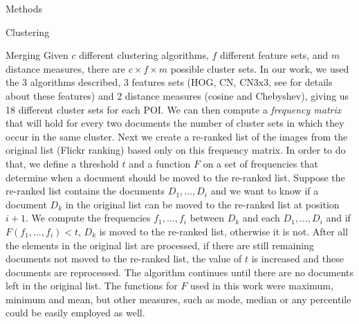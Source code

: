 \documentclass{acm_proc_article-me}
\begin{document}
\begin{section}{Methods}
\begin{subsection}{Clustering}
\begin{subsubsection}{Merging}
Given $c$ different clustering algorithms, $f$ different feature sets, and $m$ distance measures, there are $c \times f \times m$ possible cluster sets. 
In our work, we used the 3 algorithms described, 3 features sets (HOG, CN, CN3x3, see \cite{overview14} for details about these features) and 2 distance measures (cosine and Chebyshev), giving us 18 different cluster sets for each POI.
We can then compute a \emph{frequency matrix} that will hold for every two documents the number of cluster sets in which they occur in the same cluster.
Next we create a re-ranked list of the images from the original list (Flickr ranking) based only on this frequency matrix.
In order to do that, we define a threshold $t$ and a function $F$ on a set of frequencies that determine when a document should be moved to the re-ranked list.
Suppose the re-ranked list contains the documents $D_1, ..., D_i$ and we want to know if a document $D_k$ in the original list can be moved to the re-ranked list at position $i+1$. We compute the frequencies $f_1, ..., f_i$ between $D_k$ and each $D_1,...,D_i$ and if $F(f_1, ..., f_i) < t$, $D_k$ is moved to the re-ranked list, otherwise it is not. 
After all the elements in the original list are processed, if there are still remaining documents not moved to the re-ranked list, the value of $t$ is increased and these documents are reprocessed. The algorithm continues until there are no documents left in the original list.
The functions for $F$ used in this work were maximum, minimum and mean, but other measures, such as mode, median or any percentile could be easily employed as well.


\end{subsubsection}
\end{subsection}
\end{section}
\end{document}
